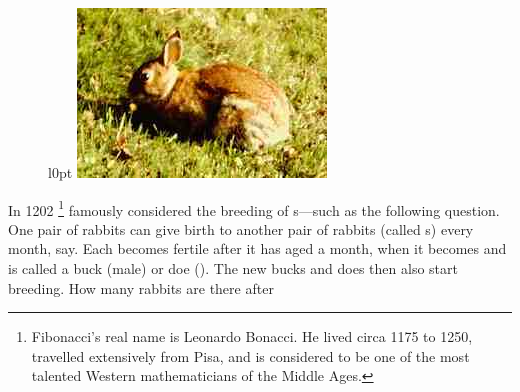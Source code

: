 \begin{reduce}
\begin{figure}l{0pt}
\includegraphics[width=\marginparwidth]{Matrices/rabbit}
\end{figure}
\begin{example}
In 1202 \footnote{%
Fibonacci's real name is Leonardo Bonacci. 
He lived circa 1175 to 1250, travelled extensively from Pisa, and is considered to be one of the most talented Western mathematicians of the Middle Ages.
} famously considered the breeding of s---such as the following question.
One pair of rabbits can give birth to another pair of rabbits (called s) every month, say.
Each  becomes fertile after it has aged a month, when it becomes  and is called a buck (male) or doe ().
The new bucks and does then also start breeding.
How many rabbits are there after 


\end{example}
\end{reduce}
